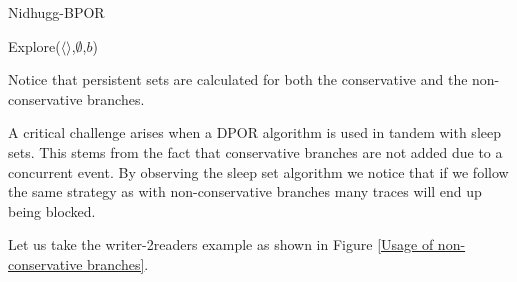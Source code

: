 \begin{algorithm}
    \caption{Nidhugg-BPOR}
    \label{Nidhugg BPOR}
    Explore($\langle \rangle$,$\emptyset$,$b$)\;
\end{algorithm}

Notice that persistent sets are calculated for both the conservative and the non-conservative branches.

A critical challenge arises when a DPOR algorithm is used in tandem with sleep sets. This stems from the fact that conservative branches are not added due to a
concurrent event. By observing the sleep set algorithm we notice that if we follow the same strategy as with non-conservative branches many traces will end up being blocked.

Let us take the writer-2readers example as shown in Figure \ref{Usage of non-conservative branches}.

